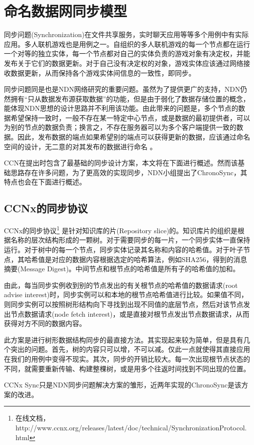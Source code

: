 \section{命名数据网同步模型}
\par
同步问题(Synchronization)在文件共享服务，实时聊天应用等等多个用例中有实际应用。多人联机游戏也是用例之一。自组织的多人联机游戏的每一个节点都在运行一个对等的独立实体，每一个节点都对自己的实体负责的游戏对象有决定权，并能发布关于它们的数据更新。对于自己没有决定权的对象，游戏实体应该通过网络接收数据更新，从而保持各个游戏实体间信息的一致性，即同步。
\par
同步问题同是也是NDN网络研究的重要问题。虽然为了提供更广的支持，NDN仍然拥有“只从数据发布源获取数据”的功能，但是由于弱化了数据存储位置的概念，能体现NDN思想的设计思路并不利用该功能。由此带来的问题是，多个节点的数据希望保持一致时，一般不存在某一特定中心节点，或是数据的最初提供者，可以为别的节点的数据负责；换言之，不存在服务器可以为多个客户端提供一致的数据。因此，发布数据的端点如果希望别的端点可以获得更新的数据，应该通过命名空间的设计，无二意的对其发布的数据进行命名 。
\par
CCN在提出时包含了最基础的同步设计方案，本文将在下面进行概述。然而该基础思路存在许多问题，为了更高效的实现同步，NDN小组提出了ChronoSync\cite{ChronosRef}，其特点也会在下面进行概述。
\subsection*{CCNx的同步协议}
\par
CCNx的同步协议\footnote{在线文档，http://www.ccnx.org/releases/latest/doc/technical/SynchronizationProtocol.html}
是针对知识库的片(Repository slice)的。知识库片的组织是根据名称的层次结构形成的一颗树。对于需要同步的每一片，一个同步实体一直保持运行。对于树中的每一个节点，同步实体记录其名称和内容的哈希值。对于叶子节点，其哈希值是对应的数据内容根据选定的哈希算法，例如SHA256，得到的消息摘要(Message Digest)。中间节点和根节点的哈希值是所有子的哈希值的加和。
\par
由此，每当同步实例收到别的节点发出的有关根节点的哈希值的数据请求(root advise interest)时，同步实例可以和本地的根节点哈希值进行比较。如果值不同，则同步实例可以按照树形结构向下寻找到出现不同值的底层节点，然后对该节点发出节点数据请求(node fetch interest)，或是直接对根节点发出节点数据请求，从而获得对方不同的数据内容。
\par
此方案是进行树形数据结构同步的最直接方法。其实现起来较为简单，但是具有几个突出的问题。首先，树的内容只可以增，不可以减。仅此一点就使得其直接应用在我们的用例中变得不现实。其次，同步的开销比较大。每一次出现根节点状态的不同，就需要重新传输、构建整棵树，或是用多个往返时间找到不同出现的位置。
\par
CCNx  Sync只是NDN同步问题解决方案的雏形，近两年实现的ChronoSync是该方案的改进。
